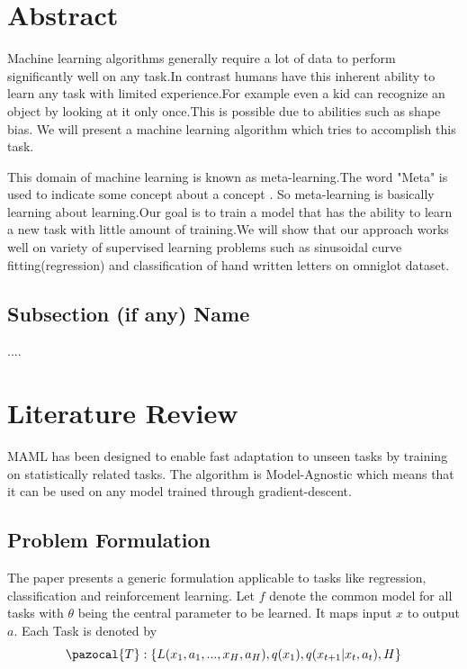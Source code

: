 \documentclass[a4paper]{article}
\newcommand{\Tb}{\pazocal{T}}
\begin{document}


\section{Abstract}

Machine learning algorithms generally require a lot of data to perform significantly well on any task.In contrast humans have this inherent ability to learn any task with limited experience.For example even a kid can recognize an object by looking at it only once.This is possible due to abilities such as shape bias. We will present a machine learning algorithm which tries to accomplish this task.

This domain of machine learning is known as meta-learning.The word "Meta" is used to indicate some concept about a concept . So meta-learning is basically learning about learning.Our goal is to train a model that has the ability to learn a new task with little amount of training.We will show that our approach works well on variety of supervised learning problems such as sinusoidal curve fitting(regression) and classification of hand written letters on omniglot dataset. 


\subsection*{Subsection (if any) Name}

....

\section{Literature Review}

MAML has been designed to enable fast adaptation to unseen tasks by training on statistically related tasks. The algorithm is Model-Agnostic which means that it can be used on any model trained through gradient-descent.

\subsection{Problem Formulation}
The paper presents a generic formulation applicable to tasks like regression, classification and reinforcement learning. Let $f$ denote the common model for all tasks with $\theta$ being the central parameter to be learned. It maps input $x$ to output $a$. Each Task is denoted by $$\Tb: \{{L}({x_1}, {a_1}, ... , {x_H}, {a_H}),q({x_1}),q({x_{t+1}}|{x_t,a_t}),H\}$$
\end{document}
